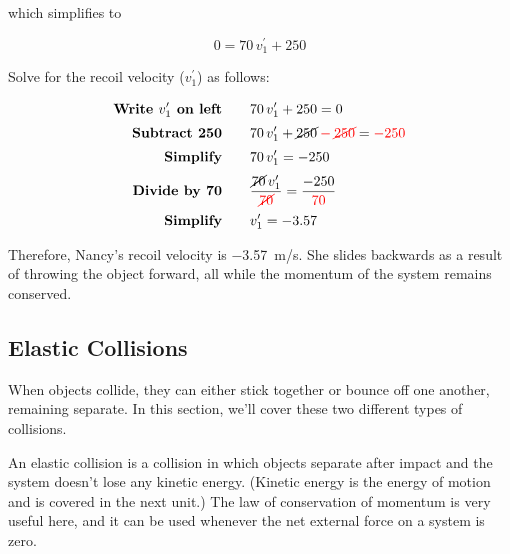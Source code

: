 \documentclass[main.tex]{subfiles}
\begin{document}
 which simplifies to 

 \begin{equation*}
     0 = 70\,v_1^{\prime} + 250
 \end{equation*}

 Solve for the recoil velocity ($v_1^{\prime}$) as follows:

 \begin{align*}
     \textbf{Write $v_1^{\prime}$ on left} \qquad & 70\,v_1^{\prime} + 250 = 0\\[0.5ex]
     \textbf{Subtract 250} \qquad & 70\,v_1^{\prime} + \cancel{250} \mathbin{\color{red} - } \textcolor{red}{\cancel{250}} = \mathbin{\color{red} - } \textcolor{red}{250}\\[0.5ex]
     \textbf{Simplify} \qquad &  70\,v_1^{\prime} = -250\\[0.5ex]
     \textbf{Divide by 70} \qquad & \frac{\cancel{70}\,v_1^{\prime}}{\textcolor{red}{\cancel{70}}} = \frac{-250}{\textcolor{red}{70}}\\[0.5ex]
     \textbf{Simplify} \qquad & v_1^{\prime} = -3.57\\
 \end{align*}

Therefore, Nancy's recoil velocity is \SI{-3.57}{m/s}. She slides backwards as a result of throwing the object forward, all while the momentum of the system remains conserved.
 
\solutionEnd


\subsection{Elastic Collisions} \label{vecM50}

When objects collide, they can either stick together or bounce off one another, remaining separate. In this section, we’ll cover these two different types of collisions.
\vspace{1em}

An \gls{elastic collision} is a collision in which objects separate after impact and the system doesn't lose any kinetic energy. (Kinetic energy is the energy of motion and is covered in the next unit.) The law of conservation of momentum is very useful here, and it can be used whenever the net external force on a system is zero. 
\vspace{1em}
\end{document}
